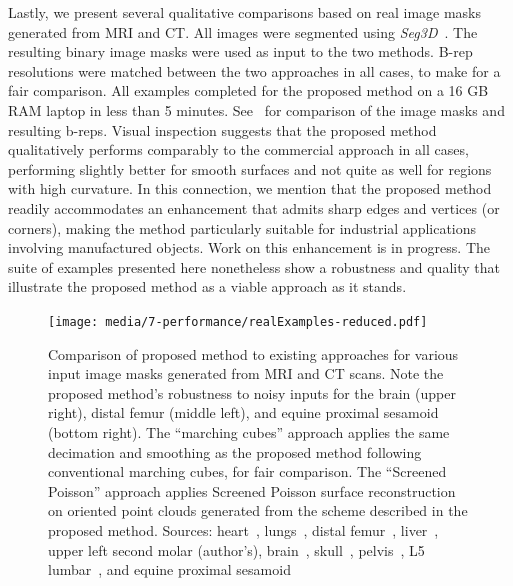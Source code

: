 Lastly, we present several qualitative comparisons based on real image masks generated from MRI and CT.  All images were segmented using \textit{Seg3D}~\cite{Seg3D}. The resulting binary image masks were used as input to the two methods. B-rep resolutions were matched between the two approaches in all cases, to make for a fair comparison. All examples completed for the proposed method on a 16 GB RAM laptop in less than 5 minutes. See~ for comparison of the image masks and resulting b-reps. Visual inspection suggests that the proposed method qualitatively performs comparably to the commercial approach in all cases, performing slightly better for smooth surfaces and not quite as well for regions with high curvature.  In this connection, we mention that the proposed method readily accommodates an enhancement that admits sharp edges and vertices (or corners), making the method particularly suitable for industrial applications involving manufactured objects.  Work on this enhancement is in progress.  The suite of examples presented here nonetheless show a robustness and quality that illustrate the proposed method as a viable approach as it stands.
\begin{figure}[h!]
	\centering
	\texttt{[image: media/7-performance/realExamples-reduced.pdf]}
	\caption{Comparison of proposed method to existing approaches for various input image masks generated from MRI and CT scans. Note the proposed method's robustness to noisy inputs for the brain (upper right), distal femur (middle left), and equine proximal sesamoid (bottom right). The ``marching cubes'' approach applies the same decimation and smoothing as the proposed method following conventional marching cubes, for fair comparison. The ``Screened Poisson'' approach applies Screened Poisson surface reconstruction on oriented point clouds generated from the scheme described in the proposed method. Sources: heart~\cite{cvgg}, lungs~\cite{rikxoort_2009}, distal femur~\cite{epperson_2013}, liver~\cite{bilic_2019}, upper left second molar (author's), brain~\cite{marcus_2007}, skull~\cite{clark_2013}, pelvis~\cite{clark_2013}, L5 lumbar~\cite{yao_2016}, and equine proximal sesamoid~\cite{shaffer2021}}
	\label{fig:example-meshes}
\end{figure}